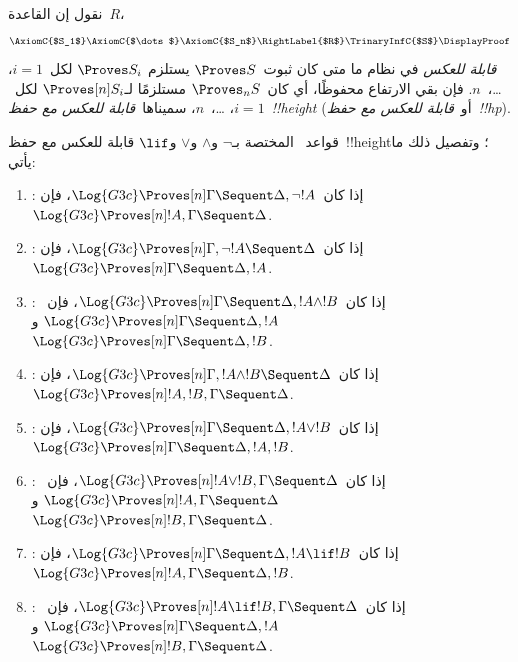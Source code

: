 \documentclass[../../../include/open-logic-section]{subfiles}
\begin{document}


\begin{defn}
نقول إن القاعدة~$R$،
\[
\AxiomC{$S_1$}
\AxiomC{$\dots$}
\AxiomC{$S_n$}
\RightLabel{$R$}
\TrinaryInfC{$S$}
\DisplayProof
\]
\emph{قابلة للعكس} في نظام ما متى كان ثبوت~$\Proves S$ يستلزم
$\Proves S_i$ لكل~$i=1$، \dots،~$n$. فإن بقي الارتفاع محفوظًا،
أي كان~$\Proves_n S$ مستلزمًا لـ$\Proves[n] S_i$ لكل~$i=1$، \dots،~$n$،
سميناها~\emph{قابلة للعكس مع حفظ~!!{height}}
(أو~\emph{قابلة للعكس مع حفظ~!!{hp}}).
\end{defn}

\begin{lem}
قواعد~ المختصة بـ$\lnot$ و$\land$ و$\lor$ و$\lif$ قابلة للعكس
مع حفظ~!!{height}؛ وتفصيل ذلك ما يأتي:
\begin{enumerate}
  \item \RightR{\lnot}: إذا كان~$\Log{G3c} \Proves[n] \Gamma \Sequent
  \Delta, \lnot !A$، فإن~$\Log{G3c} \Proves[n] !A, \Gamma \Sequent
  \Delta$.
  \item \LeftR{\lnot}: إذا كان~$\Log{G3c} \Proves[n] \Gamma, \lnot !A
  \Sequent \Delta$، فإن~$\Log{G3c} \Proves[n] \Gamma \Sequent \Delta,
  !A$.
  \item \RightR{\land}: إذا كان~$\Log{G3c} \Proves[n] \Gamma \Sequent
  \Delta, !A \land !B$، فإن~$\Log{G3c} \Proves[n] \Gamma \Sequent
  \Delta, !A$ و$\Log{G3c} \Proves[n] \Gamma \Sequent
  \Delta, !B$.
  \item \LeftR{\land}: إذا كان~$\Log{G3c} \Proves[n] \Gamma, !A \land !B
  \Sequent \Delta$، فإن~$\Log{G3c} \Proves[n] !A, !B, \Gamma \Sequent
  \Delta$.
  \item \RightR{\lor}: إذا كان~$\Log{G3c} \Proves[n] \Gamma \Sequent
  \Delta, !A \lor !B$، فإن~$\Log{G3c} \Proves[n] \Gamma \Sequent
  \Delta, !A, !B$.
  \item \LeftR{\lor}: إذا كان~$\Log{G3c} \Proves[n] !A \lor !B, \Gamma \Sequent
  \Delta$، فإن~$\Log{G3c} \Proves[n] !A, \Gamma \Sequent
  \Delta$ و$\Log{G3c} \Proves[n] !B, \Gamma \Sequent
  \Delta$.
  \item \RightR{\lif}: إذا كان~$\Log{G3c} \Proves[n] \Gamma \Sequent
  \Delta, !A \lif !B$، فإن~$\Log{G3c} \Proves[n] !A, \Gamma \Sequent
  \Delta, !B$.
  \item \LeftR{\lif}: إذا كان~$\Log{G3c} \Proves[n] !A \lif !B, \Gamma
  \Sequent \Delta$، فإن~$\Log{G3c} \Proves[n] \Gamma \Sequent \Delta,
  !A$ و$\Log{G3c} \Proves[n] !B, \Gamma \Sequent \Delta$.
\end{enumerate}
\end{lem}
\end{document}
